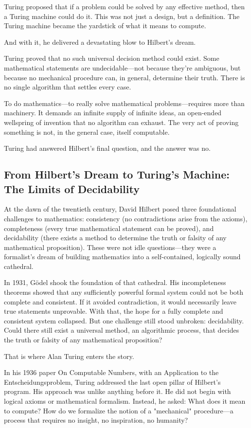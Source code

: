 Turing proposed that if a problem could be solved by any effective method, then a Turing machine could do it. This was not just a design, but a definition. The Turing machine became the yardstick of what it means to compute.

And with it, he delivered a devastating blow to Hilbert’s dream.

Turing proved that no such universal decision method could exist. Some mathematical statements are undecidable—not because they’re ambiguous, but because no mechanical procedure can, in general, determine their truth. There is no single algorithm that settles every case.

To do mathematics—to really solve mathematical problems—requires more than machinery. It demands an infinite supply of infinite ideas, an open-ended wellspring of invention that no algorithm can exhaust. The very act of proving something is not, in the general case, itself computable.

Turing had answered Hilbert’s final question, and the answer was no.


\subsection{From Hilbert’s Dream to Turing’s Machine: The Limits of Decidability}

At the dawn of the twentieth century, David Hilbert posed three foundational challenges to mathematics: consistency (no contradictions arise from the axioms), completeness (every true mathematical statement can be proved), and decidability (there exists a method to determine the truth or falsity of any mathematical proposition). These were not idle questions—they were a formalist’s dream of building mathematics into a self-contained, logically sound cathedral.

In 1931, Gödel shook the foundation of that cathedral. His incompleteness theorems showed that any sufficiently powerful formal system could not be both complete and consistent. If it avoided contradiction, it would necessarily leave true statements unprovable. With that, the hope for a fully complete and consistent system collapsed. But one challenge still stood unbroken: decidability. Could there still exist a universal method, an algorithmic process, that decides the truth or falsity of any mathematical proposition?

That is where Alan Turing enters the story.

In his 1936 paper On Computable Numbers, with an Application to the Entscheidungsproblem, Turing addressed the last open pillar of Hilbert’s program. His approach was unlike anything before it. He did not begin with logical axioms or mathematical formalism. Instead, he asked: What does it mean to compute? How do we formalize the notion of a "mechanical" procedure—a process that requires no insight, no inspiration, no humanity?


